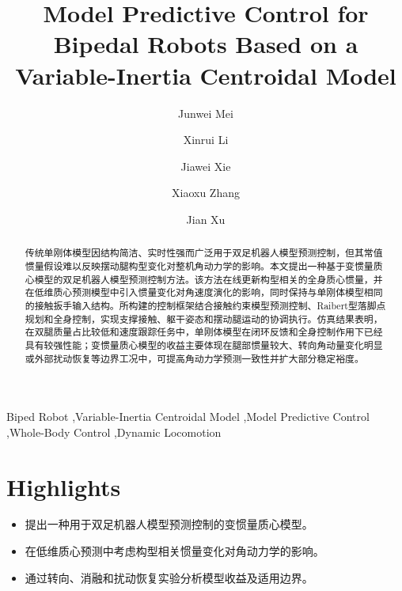 ﻿\documentclass[preprint,12pt]{elsarticle}
\begin{document}
\begin{frontmatter}

\title{Model Predictive Control for Bipedal Robots Based on a Variable-Inertia Centroidal Model}

\author[label1]{Junwei Mei}
\author[label1]{Xinrui Li}
\author[label1]{Jiawei Xie}
\author[label1,label2,label3]{Xiaoxu Zhang}
\author[label1,label2,label3]{Jian Xu}
\address[label1]{College of Intelligent Robotics and Advanced Manufacturing, Fudan University, Shanghai 200433, China}
\address[label2]{MOE Frontiers Center for Brain Science, Fudan University, Shanghai 200433, China}
\address[label3]{Yiwu Research Institute, Fudan University, Yiwu 322000, China}

\begin{abstract}
传统单刚体模型因结构简洁、实时性强而广泛用于双足机器人模型预测控制，但其常值惯量假设难以反映摆动腿构型变化对整机角动力学的影响。本文提出一种基于变惯量质心模型的双足机器人模型预测控制方法。该方法在线更新构型相关的全身质心惯量，并在低维质心预测模型中引入惯量变化对角速度演化的影响，同时保持与单刚体模型相同的接触扳手输入结构。所构建的控制框架结合接触约束模型预测控制、Raibert型落脚点规划和全身控制，实现支撑接触、躯干姿态和摆动腿运动的协调执行。仿真结果表明，在双腿质量占比较低和速度跟踪任务中，单刚体模型在闭环反馈和全身控制作用下已经具有较强性能；变惯量质心模型的收益主要体现在腿部惯量较大、转向角动量变化明显或外部扰动恢复等边界工况中，可提高角动力学预测一致性并扩大部分稳定裕度。
\end{abstract}

\begin{keyword}
Biped Robot \sep Variable-Inertia Centroidal Model \sep Model Predictive Control \sep Whole-Body Control \sep Dynamic Locomotion
\end{keyword}

\end{frontmatter}

\newpage
\section*{Highlights}
\begin{itemize}
\item 提出一种用于双足机器人模型预测控制的变惯量质心模型。
\item 在低维质心预测中考虑构型相关惯量变化对角动力学的影响。
\item 通过转向、消融和扰动恢复实验分析模型收益及适用边界。
\end{itemize}
\end{document}
